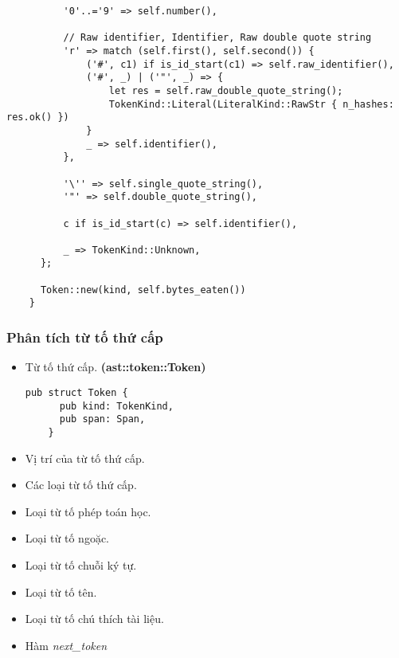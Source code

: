 {\begin{itemize}
\begin{lstlisting}
          '0'..='9' => self.number(),

          // Raw identifier, Identifier, Raw double quote string
          'r' => match (self.first(), self.second()) {
              ('#', c1) if is_id_start(c1) => self.raw_identifier(),
              ('#', _) | ('"', _) => {
                  let res = self.raw_double_quote_string();
                  TokenKind::Literal(LiteralKind::RawStr { n_hashes: res.ok() })
              }
              _ => self.identifier(),
          },

          '\'' => self.single_quote_string(),
          '"' => self.double_quote_string(),

          c if is_id_start(c) => self.identifier(),

          _ => TokenKind::Unknown,
      };

      Token::new(kind, self.bytes_eaten())
    }
  \end{lstlisting}
\end{itemize}

\subsubsection{Phân tích từ tố thứ cấp}
\begin{itemize}
  \item \label{ap1:flextoken}Từ tố thứ cấp. \textbf{(ast::token::Token)}
  \begin{lstlisting}[]
    pub struct Token {
      pub kind: TokenKind,
      pub span: Span,
    }
  \end{lstlisting}
  \item Vị trí của từ tố thứ cấp.
  \item Các loại từ tố thứ cấp.
  \item Loại từ tố phép toán học.
  \item Loại từ tố ngoặc.
  \item Loại từ tố chuỗi ký tự.
  \item Loại từ tố tên.
  \item Loại từ tố chú thích tài liệu.
  \item Hàm \textit{next\_token}
\end{itemize}

}
